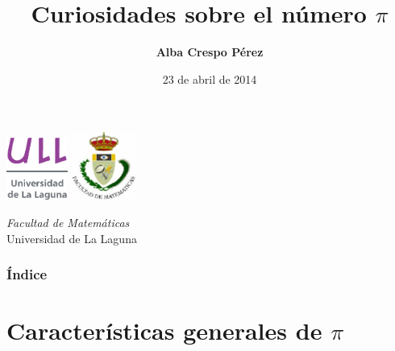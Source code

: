 \documentclass{beamer}
\title[Curiosidades sobre $\pi$]{Curiosidades sobre el número $\pi$}
\author[Alba Crespo]{\textbf{Alba Crespo Pérez}}
\institute[ULL]{}
\date[23-04-2014]{23 de abril de 2014}
\begin{document}
  
  
\begin{frame}

  \includegraphics[width=0.15\textwidth]{img/ullesc.png}
  \hspace*{7.0cm}
  \includegraphics[width=0.16\textwidth]{img/fmatesc.png}
  \titlepage

  \begin{small}
    \begin{center}
      \emph{Facultad de Matemáticas} \\
      Universidad de La Laguna
    \end{center}
  \end{small}

\end{frame}



\begin{frame}
  \frametitle{Índice}  
  \tableofcontents[pausesections]
\end{frame}


\section{Características generales de $\pi$}

\end{document}
